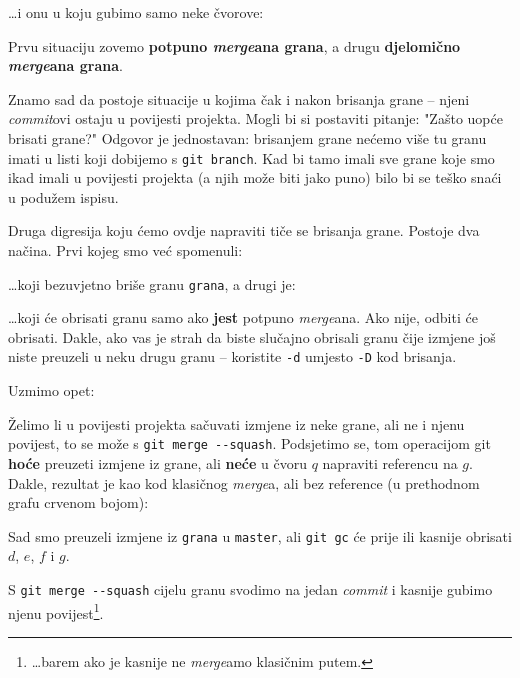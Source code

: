 

\dots{}i onu u koju gubimo samo neke čvorove:



Prvu situaciju zovemo \textbf{potpuno \emph{merge}ana grana}, a drugu \textbf{djelomično \emph{merge}ana grana}.

Znamo sad da postoje situacije u kojima čak i nakon brisanja grane -- njeni \emph{commit}ovi ostaju u povijesti projekta.
Mogli bi si postaviti pitanje: "Zašto uopće brisati grane?"
Odgovor je jednostavan:  brisanjem grane nećemo više tu granu imati u listi koji dobijemo s \verb+git branch+.
Kad bi tamo imali sve grane koje smo ikad imali u povijesti projekta (a njih može biti jako puno) bilo bi se teško snaći u podužem ispisu.

Druga digresija koju ćemo ovdje napraviti tiče se brisanja grane.
Postoje dva načina. Prvi kojeg smo već spomenuli:


\dots{}koji bezuvjetno briše granu \verb+grana+, a drugi je:


\dots{}koji će obrisati granu samo ako \textbf{jest} potpuno \emph{merge}ana.
Ako nije, odbiti će obrisati.
Dakle, ako vas je strah da biste slučajno obrisali granu čije izmjene još niste preuzeli u neku drugu granu -- koristite \verb+-d+ umjesto \verb+-D+ kod brisanja.


Uzmimo opet:



Želimo li u povijesti projekta sačuvati izmjene iz neke grane, ali ne i njenu povijest, to se može s \verb+git merge --squash+.
Podsjetimo se, tom operacijom git \textbf{hoće} preuzeti izmjene iz grane, ali \textbf{neće} u čvoru $q$ napraviti referencu na $g$.
Dakle, rezultat je kao kod klasičnog \emph{merge}a, ali bez reference (u prethodnom grafu crvenom bojom):



Sad smo preuzeli izmjene iz \verb+grana+ u \verb+master+, ali \verb+git gc+ će prije ili kasnije obrisati $d$, $e$, $f$ i $g$.

S \verb+git merge --squash+ cijelu granu svodimo na jedan \emph{commit} i kasnije gubimo njenu povijest\footnote{\dots{}barem ako je kasnije ne \emph{merge}amo klasičnim putem.}.

